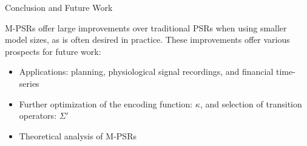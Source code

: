 \documentclass[final]{beamer}
\newlength{\onecolwid}
\begin{document}
\begin{frame}[t]
\begin{columns}[t]
\begin{column}{\onecolwid}
\begin{block}{Conclusion and Future Work}

M-PSRs offer large improvements over traditional PSRs when using smaller model sizes, as is often desired in practice. These improvements offer various prospects for future work:

\begin{itemize}
  \item Applications: planning, physiological signal recordings, and financial time-series
  \item Further optimization of the encoding function: $\kappa$, and selection of transition operators: $\Sigma'$
  \item Theoretical analysis of M-PSRs
\end{itemize}

\end{block}


%
%










\end{column}
\end{columns}
\end{frame}
\end{document}
